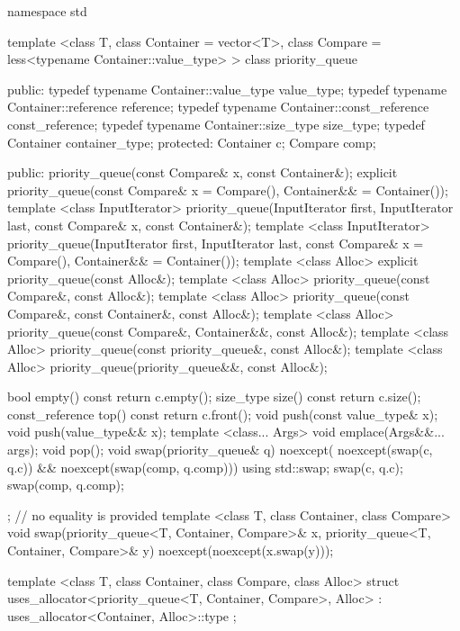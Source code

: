 \begin{codeblock}
namespace std {
  template <class T, class Container = vector<T>,
    class Compare = less<typename Container::value_type> >
  class priority_queue {
  public:
    typedef typename Container::value_type            value_type;
    typedef typename Container::reference             reference;
    typedef typename Container::const_reference       const_reference;
    typedef typename Container::size_type             size_type;
    typedef          Container                        container_type;
  protected:
    Container c;
    Compare comp;

  public:
    priority_queue(const Compare& x, const Container&);
    explicit priority_queue(const Compare& x = Compare(), Container&& = Container());
    template <class InputIterator>
      priority_queue(InputIterator first, InputIterator last,
             const Compare& x, const Container&);
    template <class InputIterator>
      priority_queue(InputIterator first, InputIterator last,
             const Compare& x = Compare(), Container&& = Container());
    template <class Alloc> explicit priority_queue(const Alloc&);
    template <class Alloc> priority_queue(const Compare&, const Alloc&);
    template <class Alloc> priority_queue(const Compare&,
      const Container&, const Alloc&);
    template <class Alloc> priority_queue(const Compare&,
      Container&&, const Alloc&);
    template <class Alloc> priority_queue(const priority_queue&, const Alloc&);
    template <class Alloc> priority_queue(priority_queue&&, const Alloc&);

    bool      empty() const       { return c.empty(); }
    size_type size()  const       { return c.size(); }
    const_reference   top() const { return c.front(); }
    void push(const value_type& x);
    void push(value_type&& x);
    template <class... Args> void emplace(Args&&... args);
    void pop();
    void swap(priority_queue& q) noexcept(
        noexcept(swap(c, q.c)) && noexcept(swap(comp, q.comp)))
      { using std::swap; swap(c, q.c); swap(comp, q.comp); }
  };
  // no equality is provided
  template <class T, class Container, class Compare>
    void swap(priority_queue<T, Container, Compare>& x,
              priority_queue<T, Container, Compare>& y) noexcept(noexcept(x.swap(y)));

  template <class T, class Container, class Compare, class Alloc>
    struct uses_allocator<priority_queue<T, Container, Compare>, Alloc>
      : uses_allocator<Container, Alloc>::type { };
}
\end{codeblock}

